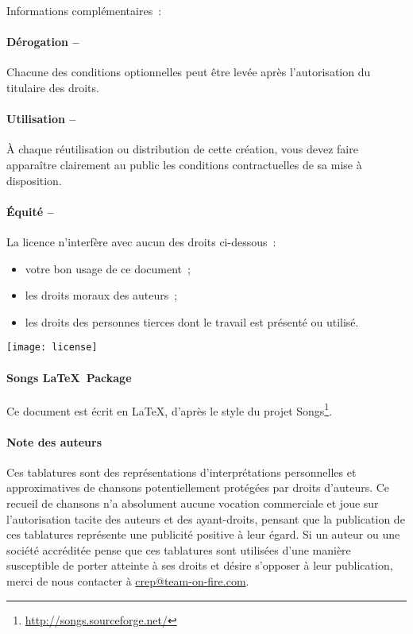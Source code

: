 \begin{lblock}{Informations complémentaires~:}
  
  \hspace{0.4cm}
  \parbox{15cm}{
    \paragraph{Dérogation --} 
    Chacune des conditions optionnelles peut être levée après
    l'autorisation du titulaire des droits.
       
    \paragraph{Utilisation --} 
    À chaque réutilisation ou distribution de cette création, vous
    devez faire apparaître clairement au public les conditions
    contractuelles de sa mise à disposition.

    \paragraph{Équité --} 
    La licence n'interfère avec aucun des droits ci-dessous~:
    \begin{itemize}
    \item votre bon usage de ce document~;
    \item les droits moraux des auteurs~;
    \item les droits des personnes tierces dont le travail est
      présenté ou utilisé.
    \end{itemize}
  }

  \begin{center}
    \texttt{[image: license]}
  \end{center}

\end{lblock}
\paragraph{Songs \LaTeX~Package}
Ce document est écrit en \LaTeX, d'après le style du projet
Songs\footnote{\url{http://songs.sourceforge.net/}}.

\paragraph{Note des auteurs}
Ces tablatures sont des représentations d'interprétations personnelles
et approximatives de chansons potentiellement protégées par droits
d'auteurs. Ce recueil de chansons n'a absolument aucune vocation
commerciale et joue sur l'autorisation tacite des auteurs et des
ayant-droits, pensant que la publication de ces tablatures représente
une publicité positive à leur égard. Si un auteur ou une société
accréditée pense que ces tablatures sont utilisées d'une manière
susceptible de porter atteinte à ses droits et désire s'opposer à leur
publication, merci de nous contacter à \url{crep@team-on-fire.com}.
